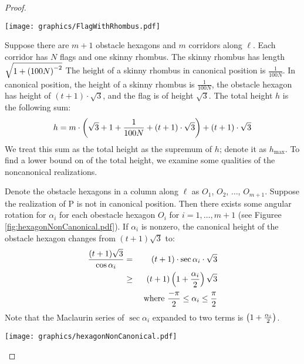 \begin{proof}
\begin{minipage}{\linewidth}
\begin{center}
\texttt{[image: graphics/FlagWithRhombus.pdf]}
\label{fig:FlagWithRhombus.pdf}
\end{center}
\end{minipage}

Suppose there are $m+1$ obstacle hexagons and $m$ corridors along $\ell$.
Each corridor has $N$ flags and one skinny rhombus. 
The skinny rhombus  has length $\sqrt{1 + \left( 100N \right)^{-2}}$
The height of a skinny rhombus in canonical position is $\frac{1}{100N}$.
In canonical position, the height of a skinny rhombus is $\frac{1}{100N}$, the obstacle hexagon has height of $ (t+1) \cdot \sqrt{3}$, and the flag is of height $\sqrt{3}$.  
The total height $h$ is the following sum:
$$h = m \cdot \left( \sqrt{3} + 1 + \frac{1}{100N} + (t+1) \cdot \sqrt{3} \right) + (t+1) \cdot \sqrt{3}$$
We treat this sum as the total height as the supremum of $h$; denote it as $h_\text{max}$.
To find a lower bound on of the total height, we examine some qualities of the noncanonical realizations.

Denote the obstacle hexagons in a column along $\ell$ as $O_1$, $O_2$, $\ldots$, $O_{m+1}$.
Suppose the realization of P is not in canonical position.
Then there exists some angular rotation for $\alpha_i$ for each obestacle hexagon $O_i$ for $i = 1 , \ldots, m+1$ (see Figuree \ref{fig:hexagonNonCanonical.pdf}).
If $\alpha_i$ is nonzero, the canonical height of the obstacle hexagon changes from $(t+1) \sqrt{3}$ to:
\begin{eqnarray*}
\frac{(t+1) \sqrt{3}}{\cos \alpha_i} &=& (t+1) \cdot \sec \alpha_i \cdot \sqrt{3}\\
&\geq& (t+1) \left( 1 + \frac{\alpha_i}{2} \right) \sqrt{3}\\
&&\text{ where } \frac{-\pi}{2} \leq \alpha_i \leq \frac{\pi}{2}
\end{eqnarray*}
Note that the Maclaurin series of $\sec \alpha_i$ expanded to two terms is $\left( 1 + \frac{\alpha_i}{2} \right) $.

\begin{minipage}{\linewidth}
\begin{center}
\texttt{[image: graphics/hexagonNonCanonical.pdf]}
\label{fig:hexagonNonCanonical.pdf}
\end{center}
\end{minipage}



\end{proof}
